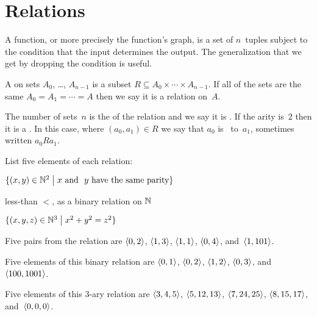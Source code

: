 \documentclass{ibl}  %
\begin{document}
\section{Relations}
A function, or more precisely the function's graph, is a set of $n$~tuples
subject to the condition that the input determines the output.
The generalization that we get by dropping the condition is useful.  

\begin{df}
A  on sets $A_0$, \ldots, $A_{n-1}$ is a subset
$R\subseteq A_0\times \cdots \times A_{n-1}$. 
If all of the sets are the same $A_0=A_1=\cdots =A$
then we say it is a relation on~$A$.

The number of sets~$n$ is the  of the relation
and we say it is .
If the arity is~$2$ then it is a .
In this case, where $(a_0,a_1)\in R$ we say 
that $a_0$ is~ to~$a_1$,
sometimes written $a_0Ra_1$.
\end{df}

\begin{ex}
List five elements of each relation:
\begin{items}
\item $\{(x,y)\in \mathbb{N}^2 \bigm| \text{$x$ and ~$y$ have the same parity}\}$
\item less-than $<$, as a binary relation on $\mathbb{N}$
\item $\{(x,y,z)\in\mathbb{N}^3 \bigm| x^2+y^2=z^2\}$
\end{items}
\begin{ans}
\begin{items}
\item Five pairs from the relation are
  $\langle0,2\rangle$, $\langle1,3\rangle$, $\langle1,1\rangle$, 
  $\langle0,4\rangle$, 
 and~$\langle1,101\rangle$.    
\item Five elements of this binary relation are 
  $\langle0,1\rangle$, $\langle0,2\rangle$, $\langle1,2\rangle$, $\langle0,3\rangle$,
  and~$\langle100,1001\rangle$. 
\item Five elements of this $3$-ary relation are
  $\langle3,4,5\rangle$, $\langle5,12,13\rangle$, $\langle7,24,25\rangle$, 
  $\langle8,15,17\rangle$, and~$\langle0,0,0\rangle$.
\end{items}
\end{ans}
\end{ex}
\end{document}
